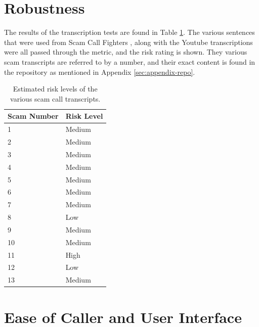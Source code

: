 \documentclass[main.tex]{subfiles}
\begin{document}
\section{Robustness}
The results of the transcription tests are found in Table \ref{tbl:robust}. The various sentences that were used from Scam Call Fighters \cite{spam-calls}, along with the Youtube transcriptions were all passed through the metric, and the risk rating is shown. They various scam transcripts are referred to by a number, and their exact content is found in the repository as mentioned in Appendix \ref{sec:appendix-repo}.

\begin{table}[htb]
\centering
\begin{tabular}{|l|l|}
	\hline
\textbf{Scam Number} & \textbf{Risk Level}                                 \\\hline
1           & Medium                                                    \\
2           & Medium                                                   \\
3           & Medium                                                 \\
4           & Medium                                                 \\
5           & Medium                                                 \\
6           & Medium                                                \\
7           & Medium                                                \\
8           & Low                                                \\
9           & Medium                                                \\
10           & Medium                                                \\
11           & High                                                \\
12           & Low                                                \\
13           & Medium  \\\hline
\end{tabular}
\caption{Estimated risk levels of the various scam call transcripts. }
\label{tbl:robust}
\end{table}

\section{Ease of Caller and User Interface}
\end{document}
